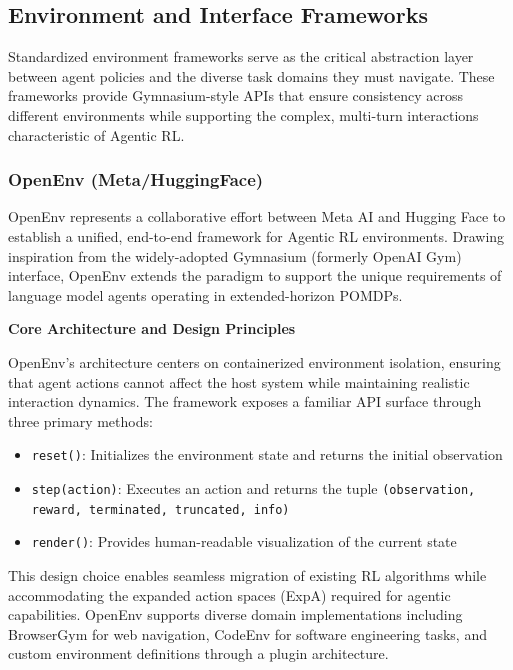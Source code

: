 \subsection{Environment and Interface Frameworks}

Standardized environment frameworks serve as the critical abstraction layer between agent policies and the diverse task domains they must navigate. These frameworks provide Gymnasium-style APIs that ensure consistency across different environments while supporting the complex, multi-turn interactions characteristic of Agentic RL.

\subsubsection{OpenEnv (Meta/HuggingFace)}

OpenEnv represents a collaborative effort between Meta AI and Hugging Face to establish a unified, end-to-end framework for Agentic RL environments. Drawing inspiration from the widely-adopted Gymnasium (formerly OpenAI Gym) interface, OpenEnv extends the paradigm to support the unique requirements of language model agents operating in extended-horizon POMDPs.

\textbf{Core Architecture and Design Principles}

OpenEnv's architecture centers on containerized environment isolation, ensuring that agent actions cannot affect the host system while maintaining realistic interaction dynamics. The framework exposes a familiar API surface through three primary methods:

\begin{itemize}
    \item \texttt{reset()}: Initializes the environment state and returns the initial observation
    \item \texttt{step(action)}: Executes an action and returns the tuple \texttt{(observation, reward, terminated, truncated, info)}
    \item \texttt{render()}: Provides human-readable visualization of the current state

\end{itemize}
This design choice enables seamless migration of existing RL algorithms while accommodating the expanded action spaces (ExpA) required for agentic capabilities. OpenEnv supports diverse domain implementations including BrowserGym for web navigation, CodeEnv for software engineering tasks, and custom environment definitions through a plugin architecture.


